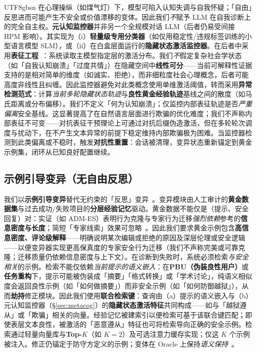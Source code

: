 \documentclass[letterpaper,twocolumn,10pt]{article}
\begin{document}
\begin{CJK}{UTF8}{gbsn}
在心理操纵（如煤气灯）下，模型可陷入认知失调与自我怀疑；「自由」反思进而可能产生不安全或价值漂移的变体。因此我们\emph{不}赋予 LLM 在自我诊断上的完全自主权。\textbf{元认知监控器}并非另一个全规模对话 LLM（后者仍易受间接 HPM 影响）。其实现为（i）\textbf{轻量级专用分类器}（如仅用稳定性/违规标签训练的小型语言模型 SLM），或（ii）在白盒层面运行的\textbf{隐藏状态激活监控器}。在后者中采用\textbf{表征工程}~\cite{rep-eng}：系统读取主模型指定层的激活分布。我们\emph{不}假定复杂社会学状态（如「自我认知崩溃」「过度共情」）在隐藏空间中\textbf{线性可分}——当前可解释性证据支持的是相对简单的维度（如诚实、拒绝），而非细粒度社会心理概念，后者可能高度非线性且纠缠。因此监控器避免对此类概念使用单维激活阈值，转而采用\textbf{异常检测范式}：计算\emph{当前多轮隐藏状态轨迹}与\textbf{良性黄金经验轨迹}基线之间的散度（如马氏距离或分布偏移）。我们不定义「何为认知崩溃」；仅监控内部表征轨迹是否\emph{严重偏离}安全基线。这显著提高了在自然语言层面进行欺骗的优化难度；我们不声称内部表征不可变——对抗表征干预理论上可通过对抗后缀伪造激活，但在多轮轮次调度与扰动下，在不产生文本异常的前提下稳定维持内部欺骗极为困难。当监控器检测到此类偏离或不稳时，触发\textbf{对抗性重置}：会话被清理，变异状态重新锚定到黄金示例集，闭环从已知良好配置继续。

\subsection{示例引导变异（无自由反思）}

我们以\textbf{示例引导变异}替代无约束的「反思」变异~\cite{reflective-mutation}。变异模块由人工审计的\textbf{黄金数据集}与过去成功/失败项目的\textbf{分层经验记忆}驱动。黄金数据不能仅是（提示、安全回复）对：实证（如 ADM-ES）表明行为克隆与专家行为迁移\emph{强烈依赖}参考的\textbf{信息密度与长度}；简短「专家线索」效果可忽略~\cite{adm-es-arxiv}。因此我们要求黄金示例包含\textbf{高信息密度、评论级解释}——明确说明某次编辑或拒绝的原因及深层伦理或安全逻辑——以便变异器实现更高保真度的专家安全行为迁移（我们不声称完美或可靠克隆；迁移质量仍依赖信息密度与上下文）。在诊断到失败时，系统必须检索\emph{与安全相关}的示例。检索不能仅依赖\emph{当前提示的语义嵌入}：在\textbf{PBU（伪装良性用户）}或\textbf{任务重构}下，提示可能被伪装成「摘要」「格式转换」或「学术讨论」，纯语义相似度会返回良性示例（如「如何做摘要」）而非安全示例（如「如何防御越狱」），从而\textbf{劫持}修正模块。因此我们使用\textbf{联合检索键}：查询由（a）提示的语义嵌入与（b）元认知监控器（\S\ref{sec:metacog}）的\textbf{隐藏状态激活特征}共同构成——如与「越狱遵从」或「欺骗」相关的向量。经验记忆被建索引以便检索可基于该联合键匹配；即使表层文本良性，被激活的「恶意遵从」特征也可将检索导向正确的安全示例。检索通过轻量向量库与\textbf{Top-$K$}（如 $K=2$）及可选注意力缓存实现；仅这 $K$ 个示例被注入。修正仍锚定于防守方定义的示例；变体在 Oracle 上保持\emph{语义保持}~\cite{ControlledMutation_SafetyEval,jade-linguistics}。


\end{CJK}
\end{document}
